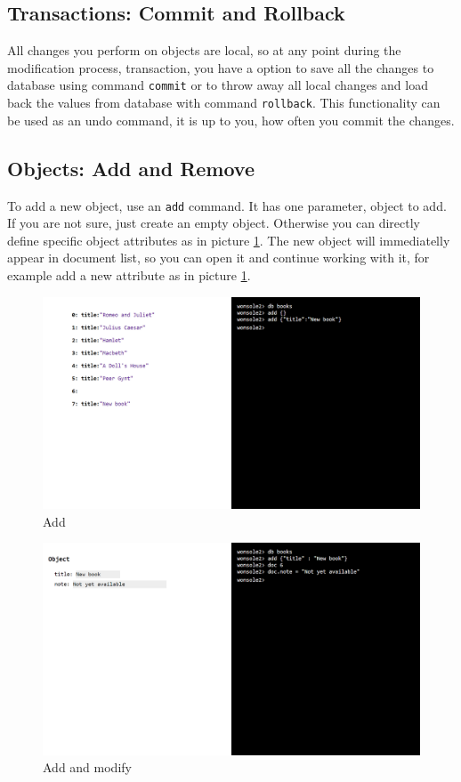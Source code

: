 \subsection{Transactions: Commit and Rollback}
All changes you perform on objects are local, so at any point during the
modification process, transaction, you have a option to save all the changes to
database using command \verb|commit| or to throw away all local changes and load
back the values from database with command \verb|rollback|. This functionality
can be used as an undo command, it is up to you, how often you commit the
changes.


\subsection{Objects: Add and Remove}
To add a new object, use an \verb|add| command. It has one parameter, object to
add. If you are not sure, just create an empty object. Otherwise you can
directly define specific object attributes as in picture \ref{wonsole2-48}. The
new object will immediatelly appear in document list, so you can open
it and continue working with it, for example add a new attribute as in picture
\ref{wonsole2-48}.


\begin{figure}
\centering
\includegraphics[width=\textwidth]{../../manual/screenshot/wonsole2/wonsole2-48.png}
\caption{Add}
\label{wonsole2-48}
\end{figure}

\begin{figure}
\centering
\includegraphics[width=\textwidth]{../../manual/screenshot/wonsole2/wonsole2-55.png}
\caption{Add and modify}
\label{wonsole2-55}
\end{figure}
